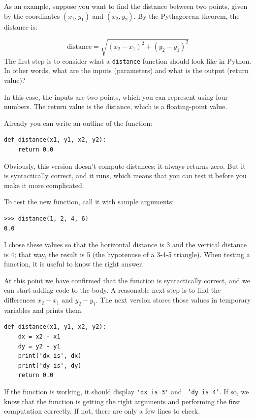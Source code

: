 \documentclass[10pt]{book}
\begin{document}

As an example, suppose you want to find the distance between two
points, given by the coordinates $(x_1, y_1)$ and $(x_2, y_2)$.
By the Pythagorean theorem, the distance is:

\begin{displaymath}
\mathrm{distance} = \sqrt{(x_2 - x_1)^2 + (y_2 - y_1)^2}
\end{displaymath}
%
The first step is to consider what a {\tt distance} function should
look like in Python.  In other words, what are the inputs (parameters)
and what is the output (return value)?

In this case, the inputs are two points, which you can represent
using four numbers.  The return value is the distance, which is
a floating-point value.

Already you can write an outline of the function:

\beforeverb
\begin{verbatim}
def distance(x1, y1, x2, y2):
    return 0.0
\end{verbatim}
\afterverb
%
Obviously, this version doesn't compute distances; it always returns
zero.  But it is syntactically correct, and it runs, which means that
you can test it before you make it more complicated.

To test the new function, call it with sample arguments:

\beforeverb
\begin{verbatim}
>>> distance(1, 2, 4, 6)
0.0
\end{verbatim}
\afterverb
%
I chose these values so that the horizontal distance is 3 and the
vertical distance is 4; that way, the result is 5
(the hypotenuse of a 3-4-5 triangle). When testing a function, it is
useful to know the right answer.


At this point we have confirmed that the function is syntactically
correct, and we can start adding code to the body.
A reasonable next step is to find the differences
$x_2 - x_1$ and $y_2 - y_1$.  The next version stores those values in
temporary variables and prints them.

\beforeverb
\begin{verbatim}
def distance(x1, y1, x2, y2):
    dx = x2 - x1
    dy = y2 - y1
    print('dx is', dx)
    print('dy is', dy)
    return 0.0
\end{verbatim}
\afterverb
%
If the function is working, it should display \verb"'dx is 3'" and {\tt
'dy is 4'}.  If so, we know that the function is getting the right
arguments and performing the first computation correctly.  If not,
there are only a few lines to check.
\end{document}
